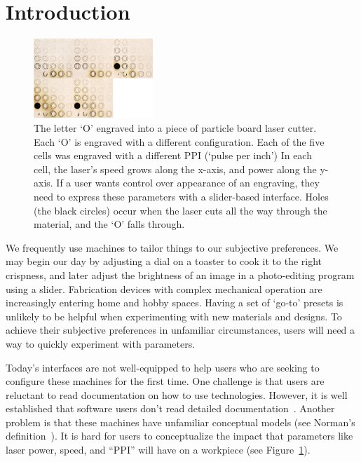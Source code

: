 \section{Introduction}

\begin{figure}
  \centering
  \includegraphics[width=0.4\textwidth]{figures/engravings}
  \caption{%
    The letter `O' engraved into a piece of particle board laser cutter.
    Each `O' is engraved with a different configuration.
    Each of the five cells was engraved with a different PPI (`pulse per inch')
    In each cell, the laser's speed grows along the x-axis, and power along the y-axis.
    If a user wants control over appearance of an engraving, they need to express these parameters with a slider-based interface.
    Holes (the black circles) occur when the laser cuts all the way through the material, and the `O' falls through.
  }\label{fig:engravings}
\end{figure}

We frequently use machines to tailor things to our subjective preferences.
We may begin our day by adjusting a dial on a toaster to cook it to the right crispness, and later adjust the brightness of an image in a photo-editing program using a slider.
Fabrication devices with complex mechanical operation are increasingly entering home and hobby spaces.
Having a set of `go-to' presets is unlikely to be helpful when experimenting with new materials and designs.
To achieve their subjective preferences in unfamiliar circumstances, users will need a way to quickly experiment with parameters.

Today's interfaces are not well-equipped to help users who are seeking to configure these machines for the first time.
One challenge is that users are reluctant to read documentation on how to use technologies.
However, it is well established that software users don't read detailed documentation~\cite{carroll_nurnberg_1990}.
Another problem is that these machines have unfamiliar conceptual models (see Norman's definition~\cite{norman_design_2002}).
It is hard for users to conceptualize the impact that parameters like laser power, speed, and ``PPI'' will have on a workpiece (see Figure~\ref{fig:engravings}).


